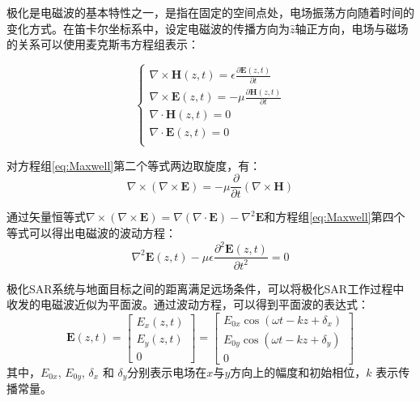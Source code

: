 极化是电磁波的基本特性之一，是指在固定的空间点处，电场振荡方向随着时间的变化方式。在笛卡尔坐标系中，设定电磁波的传播方向为$\hat{z}$轴正方向，电场与磁场的关系可以使用麦克斯韦方程组表示：

\begin{equation}
  \label{eq:Maxwell}
  \begin{cases}
    \nabla \times \boldsymbol{H}(z,t)=\epsilon \frac{\partial \boldsymbol{E}(z,t)}{\partial t} \\
    \nabla \times \boldsymbol{E}(z,t)=-\mu \frac{\partial \boldsymbol{H}(z,t)}{\partial t}     \\
    \nabla \cdot \boldsymbol{H}(z,t)=0                                                         \\
    \nabla \cdot \boldsymbol{E}(z,t)=0                                                         \\
  \end{cases}
\end{equation}

对方程组\eqref{eq:Maxwell}第二个等式两边取旋度，有：
\begin{equation}
  \nabla \times(\nabla \times \boldsymbol{E})=-\mu \frac{\partial}{\partial t}(\nabla \times \boldsymbol{H})
\end{equation}

通过矢量恒等式$\nabla \times(\nabla \times \boldsymbol{E})=\nabla(\nabla \cdot \boldsymbol{E})-\nabla^2 \boldsymbol{E}$和方程组\eqref{eq:Maxwell}第四个等式可以得出电磁波的波动方程：
\begin{equation}
  \nabla^2 \boldsymbol{E}(z, t)-\mu \epsilon \frac{\partial^2 \boldsymbol{E}(z, t)}{\partial t^2}=0
\end{equation}

极化SAR系统与地面目标之间的距离满足远场条件，可以将极化SAR工作过程中收发的电磁波近似为平面波。通过波动方程，可以得到平面波的表达式：
\begin{equation}
  \label{平面波}
  \boldsymbol{E}(z, t)=\left[\begin{array}{c}
      E_x(z, t) \\
      E_y(z, t) \\
      0
    \end{array}\right]=\left[\begin{array}{c}
      E_{0 x} \cos \left(\omega t-k z+\delta_x\right) \\
      E_{0 y} \cos \left(\omega t-k z+\delta_y\right) \\
      0
    \end{array}\right]
\end{equation}
其中，$E_{0x}$, $E_{0y}$, $\delta_x$ 和 $\delta_y$分别表示电场在$x$与$y$方向上的幅度和初始相位，$k$ 表示传播常量。

